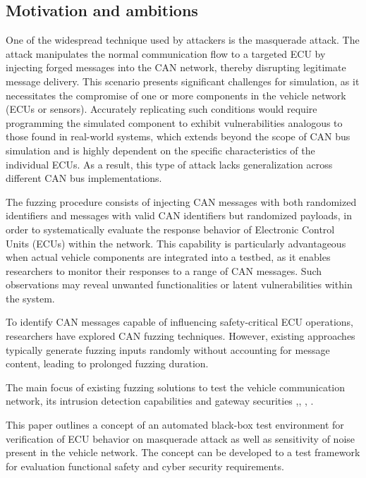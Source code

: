 \documentclass[a4paper, fleqn]{template/cas-dc}
\begin{document}
	\subsection{Motivation and ambitions}
	
	One of the widespread technique used by attackers is the masquerade attack. The attack manipulates the normal communication flow to a targeted ECU by injecting forged messages into the CAN network, thereby disrupting legitimate message delivery. This scenario presents significant challenges for simulation, as it necessitates the compromise of one or more components in the vehicle network (ECUs or sensors). Accurately replicating such conditions would require programming the simulated component to exhibit vulnerabilities analogous to those found in real-world systems, which extends beyond the scope of CAN bus simulation and is highly dependent on the specific characteristics of the individual ECUs. As a result, this type of attack lacks generalization across different CAN bus implementations.
	
	The fuzzing procedure consists of injecting CAN messages with both randomized identifiers and messages with valid CAN identifiers but randomized payloads, in order to systematically evaluate the response behavior of Electronic Control Units (ECUs) within the network. This capability is particularly advantageous when actual vehicle components are integrated into a testbed, as it enables researchers to monitor their responses to a range of CAN messages. Such observations may reveal unwanted functionalities or latent vulnerabilities within the system. 
	
	To identify CAN messages capable of influencing safety-critical ECU operations, researchers have explored CAN fuzzing techniques. However, existing approaches typically generate fuzzing inputs randomly without accounting for message content, leading to prolonged fuzzing duration.
	
	The main focus of existing fuzzing solutions to test the vehicle communication network, its intrusion detection capabilities and gateway securities \cite{9713864},\cite{8416255}, \cite{9719242}, \cite{fowler2019method}.
				
	This paper outlines a concept of an automated black-box test environment for verification of ECU behavior on masquerade attack as well as sensitivity of noise present in the vehicle network. The concept can be developed to a test framework for evaluation functional safety and cyber security requirements.
	
\end{document}
